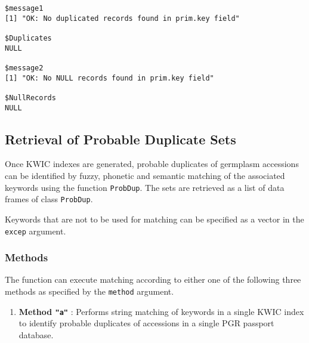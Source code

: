 \documentclass[]{article}
\providecommand{\tightlist}{%
  \setlength{\itemsep}{0pt}\setlength{\parskip}{0pt}}
\begin{document}
\begin{verbatim}
$message1
[1] "OK: No duplicated records found in prim.key field"

$Duplicates
NULL

$message2
[1] "OK: No NULL records found in prim.key field"

$NullRecords
NULL
\end{verbatim}

\hypertarget{retrieval-of-probable-duplicate-sets}{%
\subsection{Retrieval of Probable Duplicate
Sets}\label{retrieval-of-probable-duplicate-sets}}

Once KWIC indexes are generated, probable duplicates of germplasm
accessions can be identified by fuzzy, phonetic and semantic matching of
the associated keywords using the function \texttt{ProbDup}. The sets
are retrieved as a list of data frames of class \texttt{ProbDup}.

Keywords that are not to be used for matching can be specified as a
vector in the \texttt{excep} argument.

\hypertarget{methods}{%
\subsubsection{Methods}\label{methods}}

The function can execute matching according to either one of the
following three methods as specified by the \texttt{method} argument.

\begin{enumerate}
\def\labelenumi{\arabic{enumi}.}
\tightlist
\item
  \textbf{Method \texttt{"a"}} : Performs string matching of keywords in
  a single KWIC index to identify probable duplicates of accessions in a
  single PGR passport database.
\end{enumerate}
\end{document}
